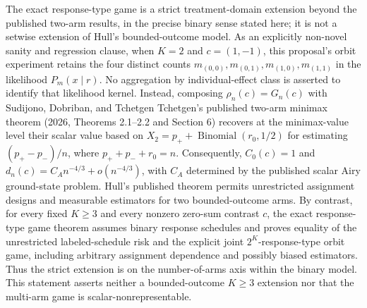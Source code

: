 The exact response-type game is a strict treatment-domain extension beyond the published two-arm results, in the precise binary sense stated here; it is not a setwise extension of Hull's bounded-outcome model. As an explicitly non-novel sanity and regression clause, when \(K=2\) and \(c=(1,-1)\), this proposal's orbit experiment retains the four distinct counts \(m_{(0,0)},m_{(0,1)},m_{(1,0)},m_{(1,1)}\) in the likelihood \(P_m(x\mid r)\). No aggregation by individual-effect class is asserted to identify that likelihood kernel. Instead, composing \(\rho_n(c)=G_n(c)\) with Sudijono, Dobriban, and Tchetgen Tchetgen's published two-arm minimax theorem (2026, Theorems 2.1--2.2 and Section 6) recovers at the minimax-value level their scalar value based on \(X_2=p_++\operatorname{Binomial}(r_0,1/2)\) for estimating \((p_+-p_-)/n\), where \(p_++p_-+r_0=n\). Consequently, \(C_0(c)=1\) and \(d_n(c)=C_A n^{-4/3}+o(n^{-4/3})\), with \(C_A\) determined by the published scalar Airy ground-state problem. Hull's published theorem permits unrestricted assignment designs and measurable estimators for two bounded-outcome arms. By contrast, for every fixed \(K\geq3\) and every nonzero zero-sum contrast \(c\), the exact response-type game theorem assumes binary response schedules and proves equality of the unrestricted labeled-schedule risk and the explicit joint \(2^K\)-response-type orbit game, including arbitrary assignment dependence and possibly biased estimators. Thus the strict extension is on the number-of-arms axis within the binary model. This statement asserts neither a bounded-outcome \(K\geq3\) extension nor that the multi-arm game is scalar-nonrepresentable.